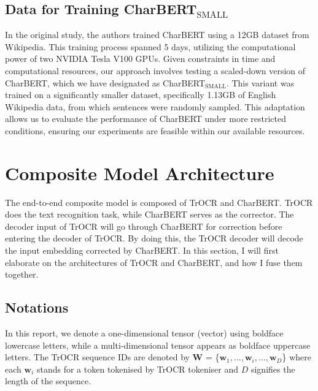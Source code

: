 \subsection{Data for Training CharBERT$_{\text{SMALL}}$}
\label{subsec:3_data_for_training_charbert}
In the original study, the authors trained CharBERT using a 12GB dataset from Wikipedia. This training process spanned 5 days, utilizing the computational power of two NVIDIA Tesla V100 GPUs. Given constraints in time and computational resources, our approach involves testing a scaled-down version of CharBERT, which we have designated as CharBERT$_{\text{SMALL}}$. This variant was trained on a significantly smaller dataset, specifically 1.13GB of English Wikipedia data, from which sentences were randomly sampled. This adaptation allows us to evaluate the performance of CharBERT under more restricted conditions, ensuring our experiments are feasible within our available resources.
\section{Composite Model Architecture}
\label{sec:3_composite_model_architecture}
The end-to-end composite model is composed of TrOCR and CharBERT. TrOCR does the text recognition task, while CharBERT serves as the corrector. The decoder input of TrOCR will go through CharBERT for correction before entering the decoder of TrOCR. By doing this, the TrOCR decoder will decode the input embedding corrected by CharBERT. In this section, I will first elaborate on the architectures of TrOCR and CharBERT, and how I fuse them together.

\subsection{Notations}
\label{subsec:3_Notations}
In this report, we denote a one-dimensional tensor (vector) using boldface lowercase letters, while a multi-dimensional tensor appears as boldface uppercase letters. The TrOCR sequence IDs are denoted by $\mathbf{W}$ = \{$\mathbf{w}_1, ..., \mathbf{w}_i, ..., \mathbf{w}_D$\} where each $\mathbf{w}_i$ stands for a token tokenised by TrOCR tokeniser and $D$ signifies the length of the sequence. 

